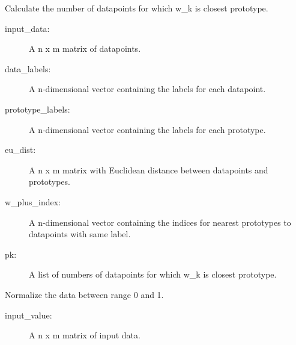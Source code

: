 \documentclass[letterpaper,10pt,english]{sphinxmanual}
\begin{document}
\begin{fulllineitems}
\begin{fulllineitems}
\begin{description}
\end{description}

\end{fulllineitems}


\begin{fulllineitems}
\label{\detokenize{index:lmlvq_distance.LMLVQ.mod_Pk}}
Calculate the number of datapoints for which w\_k is closest prototype.
\begin{description}
\item[{input\_data:}] \leavevmode
A n x m matrix of datapoints.

\item[{data\_labels:}] \leavevmode
A n-dimensional vector containing the labels for each
datapoint.

\item[{prototype\_labels:}] \leavevmode
A n-dimensional vector containing the labels for each
prototype.

\item[{eu\_dist:}] \leavevmode
A n x m matrix with Euclidean distance between datapoints and
prototypes.

\end{description}
\begin{description}
\item[{w\_plus\_index:}] \leavevmode
A n-dimensional vector containing the indices for nearest
prototypes to datapoints with same label.

\item[{pk:}] \leavevmode
A list  of numbers of datapoints for which w\_k is closest
prototype.

\end{description}

\end{fulllineitems}


\begin{fulllineitems}
\label{\detokenize{index:lmlvq_distance.LMLVQ.normalization}}
Normalize the data between range 0 and 1.
\begin{description}
\item[{input\_value:}] \leavevmode
A n x m matrix of input data.


\end{description}
\end{fulllineitems}
\end{fulllineitems}
\end{document}
